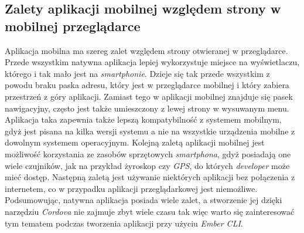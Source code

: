 \documentclass[openright]{xmgr}
\begin{document}
\subsection{Zalety aplikacji mobilnej względem strony w mobilnej przeglądarce}
Aplikacja mobilna ma szereg zalet względem strony otwieranej w przeglądarce. Przede wszystkim natywna aplikacja lepiej wykorzystuje miejsce na wyświetlaczu, którego i tak mało jest na \textit{smartphonie}. Dzieje się tak przede wszystkim z powodu braku paska adresu, który jest w przeglądarce mobilnej i który zabiera przestrzeń z góry aplikacji. Zamiast tego w aplikacji mobilnej znajduje się pasek nawigacyjny, często jest także umieszczony z lewej strony w wysuwanym menu. Aplikacja taka zapewnia także lepszą kompatybilność z systemem mobilnym, gdyż jest pisana na kilka wersji systemu a nie na wszystkie urządzenia mobilne z dowolnym systemem operacyjnym. Kolejną zaletą aplikacji mobilnej jest możliwość korzystania ze zasobów sprzętowych \textit{smartphona}, gdyż posiadają one wiele czujników, jak na przykład żyroskop czy \textit{GPS}, do których \textit{developer} może mieć dostęp. Następną zaletą jest używanie niektórych aplikacji bez połączenia z internetem, co w przypadku aplikacji przeglądarkowej jest niemożliwe. Podsumowując, natywna aplikacja posiada wiele zalet, a stworzenie jej dzięki narzędziu \textit{Cordova} nie zajmuje zbyt wiele czasu tak więc warto się zainteresować tym tematem podczas tworzenia aplikacji przy użyciu \textit{Ember CLI}.
\end{document}
